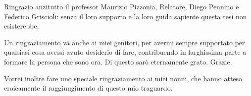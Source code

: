 Ringrazio anzitutto il professor Maurizio Pizzonia, Relatore, Diego Pennino e Federico Griscioli: senza il loro supporto e la loro guida sapiente questa tesi non esisterebbe.

\medskip
\medskip
Un ringraziamento va anche ai miei genitori, per avermi sempre supportato per qualsiasi cosa avessi avuto desiderio di fare, contribuendo in larghissima parte a formare la persona che sono ora. Di questo sarò eternamente grato. Grazie.

\medskip
\medskip
Vorrei inoltre fare uno speciale ringraziamento ai miei nonni, che hanno atteso eroicamente il raggiungimento di questo mio traguardo.

